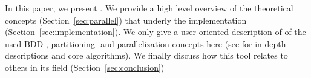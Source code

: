 In this paper, we present \toolname. We provide a high level overview of the theoretical concepts (Section~\ref{sec:parallel}) that underly the implementation (Section~\ref{sec:implementation}). We only give a user-oriented description of of the used BDD-, partitioning- and parallelization concepts here (see \cite{dal2018parallel, dal2021compositional} for in-depth descriptions and core algorithms). We finally discuss how this tool relates to others in its field (Section~\ref{sec:conclusion})



